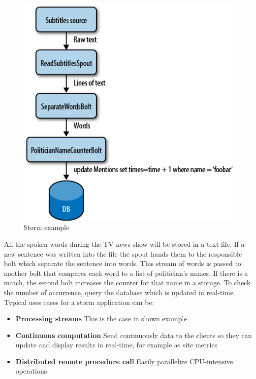 \documentclass[a4paper]{article}
\begin{document}
\begin{figure}[h!]
	\centering
	\includegraphics[scale=0.5]{images/storm_example.png}
	\caption{Storm example}
	\label{storm_example}
\end{figure}
All the spoken words during the TV news show will be stored in a text file. If a new sentence was written into the file the spout hands them to the responsible bolt which separate the sentence into words. This stream of words is passed to another bolt that compares each word to a list of politician's names. If there is a match, the second bolt increases the counter for that name in a storage. To check the number of occurrence, query the database which is updated in real-time.\\
Typical uses cases for a storm application can be:
\begin{itemize}
	\item \textbf{Processing streams} This is the case in shown example 
	\item \textbf{Continuous computation} Send continuously data to the clients so they can update and display results in real-time, for example as site metrics 
	\item \textbf{Distributed remote procedure call} Easily parallelize CPU-intensive operations
\end{itemize}
\end{document}

